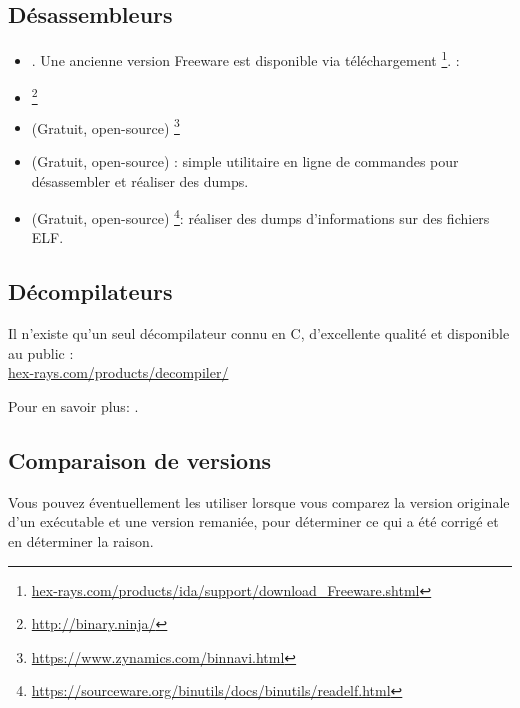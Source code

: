\subsection{Désassembleurs}


\begin{itemize}
\item {}. Une ancienne version Freeware est disponible via téléchargement
\footnote{\href{http://go.yurichev.com/17031}{hex-rays.com/products/ida/support/download\_Freeware.shtml}}.
\ShortHotKeyCheatsheet: 

\item {}\footnote{\url{http://binary.ninja/}}

\item (Gratuit, open-source) \footnote{\url{https://www.zynamics.com/binnavi.html}}

\item (Gratuit, open-source) : simple utilitaire en ligne de commandes pour désassembler et réaliser des dumps.

\item (Gratuit, open-source) \footnote{\url{https://sourceware.org/binutils/docs/binutils/readelf.html}}:
réaliser des dumps d'informations sur des fichiers ELF.
\end{itemize}

\subsection{Décompilateurs}

Il n'existe qu'un seul décompilateur connu en C, d'excellente qualité et disponible au public :\\
\href{http://go.yurichev.com/17033}{hex-rays.com/products/decompiler/}

Pour en savoir plus: .

\subsection{Comparaison de versions}

Vous pouvez éventuellement les utiliser lorsque vous comparez la version originale d'un exécutable et une version remaniée, pour déterminer ce qui a été corrigé et en déterminer la raison.

